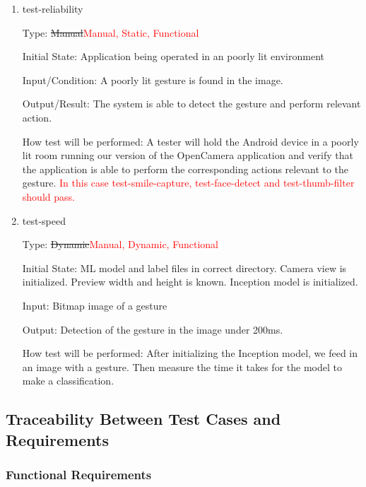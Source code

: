 \documentclass[12pt, titlepage]{article}
\begin{document}
\begin{enumerate}

\item{test-reliability\\}

Type: \sout{Manual}\textcolor{red}{Manual, Static, Functional}
					
Initial State: Application being operated in an poorly lit environment
				
Input/Condition: A poorly lit gesture is found in the image.
					
Output/Result: The system is able to detect the gesture and perform relevant action.
					
How test will be performed: A tester will hold the Android device in a poorly lit room running our version of the OpenCamera application and verify that the application is able to perform the corresponding actions relevant to the gesture. \textcolor{red}{In this case test-smile-capture, test-face-detect and test-thumb-filter should pass.}
					
\item{test-speed\\}

Type: \sout{Dynamic}\textcolor{red}{Manual, Dynamic, Functional}
					
Initial State: ML model and label files in correct directory. Camera view is initialized. Preview width and height is known. Inception model is initialized. 
					
Input: Bitmap image of a gesture
					
Output: Detection of the gesture in the image under 200ms.
					
How test will be performed: After initializing the Inception model, we feed in an image with a gesture. Then measure the time it takes for the model to make a classification.

\end{enumerate}

\subsection{Traceability Between Test Cases and Requirements}

\subsubsection{Functional Requirements}
\end{document}
